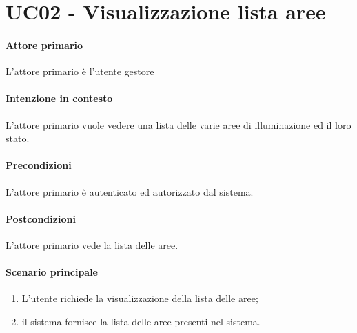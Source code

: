\section{UC02 - Visualizzazione lista aree}

\paragraph{Attore primario} L'attore primario è l'utente gestore
\paragraph{Intenzione in contesto} L'attore primario vuole vedere una lista delle varie aree di illuminazione ed il loro stato.

\paragraph{Precondizioni} L'attore primario è autenticato ed autorizzato dal sistema.

\paragraph{Postcondizioni} L'attore primario vede la lista delle aree.

\paragraph{Scenario principale}

\begin{enumerate}
    \item L'utente richiede la visualizzazione della lista delle aree;
    \item il sistema fornisce la lista delle aree presenti nel sistema.
\end{enumerate}
